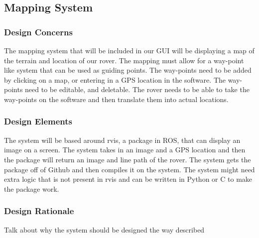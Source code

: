 \subsection{Mapping System}
\subsubsection{Design Concerns}
The mapping system that will be included in our GUI will be displaying a map of the terrain and location of our rover.
The mapping must allow for a way-point like system that can be used as guiding points.
The way-points need to be added by clicking on a map, or entering in a GPS location in the software.
The way-points need to be editable, and deletable.
The rover needs to be able to take the way-points on the software and then translate them into actual locations.
\subsubsection{Design Elements}
The system will be based around rvis, a package in ROS, that can display an image on a screen.
The system takes in an image and a GPS location and then the package will return an image and line path of the rover.
The system gets the package off of Github and then compiles it on the system.
The system might need extra logic that is not present in rvis and can be written in Python or C to make the package work.
\subsubsection{Design Rationale}
Talk about why the system should be designed the way described

